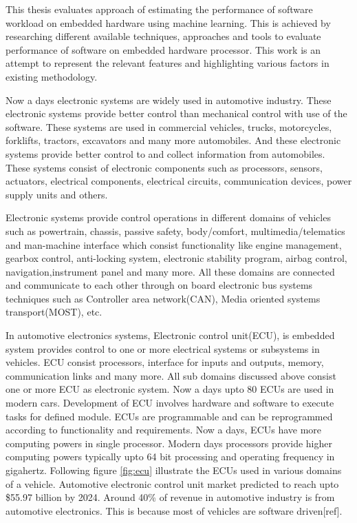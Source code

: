 \setlength{\parindent}{4em}
\setlength{\parskip}{1em}

This thesis evaluates approach of estimating the performance of software workload on embedded hardware using machine learning. This is achieved by researching different available techniques, approaches and tools to evaluate performance of software on embedded hardware processor. This work is an attempt to represent the relevant features and highlighting various factors in existing methodology. 


\par Now a days electronic systems are widely used in automotive industry. These electronic systems provide better control than mechanical control with use of the software. These systems are used in commercial vehicles, trucks, motorcycles, forklifts, tractors, excavators and many more automobiles. And these electronic systems provide better control to and collect information from automobiles. These systems consist of electronic components such as processors, sensors, actuators, electrical components, electrical circuits, communication devices, power supply units and others. 

\par Electronic systems provide control operations in different domains of vehicles such as powertrain, chassis, passive safety, body/comfort, multimedia/telematics and man-machine interface which consist functionality like engine management, gearbox control, anti-locking system, electronic stability program, airbag control, navigation,instrument panel and many more. All these domains are connected and communicate to each other through on board electronic bus systems techniques such as Controller area network(CAN), Media oriented systems transport(MOST), etc.

\par In automotive electronics systems, Electronic control unit(ECU), is embedded system provides control to one or more electrical systems or subsystems in vehicles. ECU consist processors, interface for inputs and outputs, memory, communication links and many more. All sub domains discussed above consist one or more ECU as electronic system. Now a days upto 80 ECUs are used in modern cars. Development of ECU involves hardware and software to execute tasks for defined module. ECUs are programmable and can be reprogrammed according to functionality and requirements. Now a days, ECUs have more computing powers in single processor. Modern days processors provide higher computing powers typically upto 64 bit processing and operating frequency in gigahertz. Following figure \ref{fig:ecu} illustrate the ECUs used in various domains of a vehicle. Automotive electronic control unit market predicted to reach upto \$55.97 billion by 2024. Around 40\% of revenue in automotive industry is from automotive electronics. This is because most of vehicles are software driven[ref].

